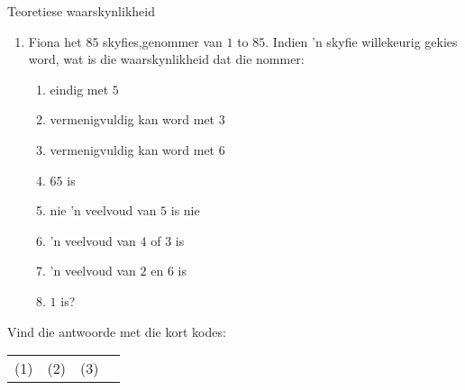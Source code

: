 \begin{exercises}{Teoretiese waarskynlikheid}
\begin{enumerate}[itemsep=5pt, label=\textbf{\arabic*}]
  \item Fiona het $85$ skyfies,genommer van $1$ to
    $85$. Indien 'n skyfie willekeurig gekies word, wat is die waarskynlikheid dat die nommer: 
    \begin{enumerate}
    \item eindig met $5$
    \item vermenigvuldig kan word met $3$
    \item vermenigvuldig kan word met  $6$
    \item $65$ is
    \item nie 'n veelvoud van $5$ is nie
    \item 'n veelvoud van $4$ of $3$ is
    \item 'n veelvoud van $2$ en $6$ is
    \item  $1$ is?
    \end{enumerate}
  \end{enumerate}

  Vind die antwoorde met die kort kodes: \\
  \begin{tabularx}{\textwidth}{XXXX}
    (1) & (2) & (3) \\
  \end{tabularx}
\end{exercises}

